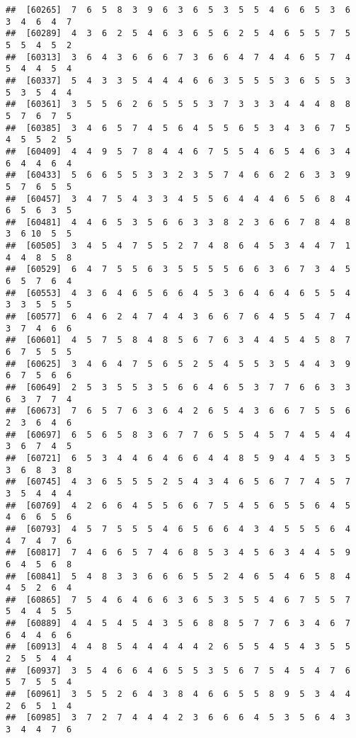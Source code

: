 \documentclass[
]{book}
\begin{document}
\begin{verbatim}
##  [60265]  7  6  5  8  3  9  6  3  6  5  3  5  5  4  6  6  5  3  6  3  4  6  4  7
##  [60289]  4  3  6  2  5  4  6  3  6  5  6  2  5  4  6  5  5  7  5  5  5  4  5  2
##  [60313]  3  6  4  3  6  6  6  7  3  6  6  4  7  4  4  6  5  7  4  5  4  4  5  4
##  [60337]  5  4  3  3  5  4  4  4  6  6  3  5  5  5  3  6  5  5  3  5  3  5  4  4
##  [60361]  3  5  5  6  2  6  5  5  5  3  7  3  3  3  4  4  4  8  8  5  7  6  7  5
##  [60385]  3  4  6  5  7  4  5  6  4  5  5  6  5  3  4  3  6  7  5  4  5  5  2  5
##  [60409]  4  4  9  5  7  8  4  4  6  7  5  5  4  6  5  4  6  3  4  6  4  4  6  4
##  [60433]  5  6  6  5  5  3  3  2  3  5  7  4  6  6  2  6  3  3  9  5  7  6  5  5
##  [60457]  3  4  7  5  4  3  3  4  5  5  6  4  4  4  6  5  6  8  4  6  5  6  3  5
##  [60481]  4  4  6  5  3  5  6  6  3  3  8  2  3  6  6  7  8  4  8  3  6 10  5  5
##  [60505]  3  4  5  4  7  5  5  2  7  4  8  6  4  5  3  4  4  7  1  4  4  8  5  8
##  [60529]  6  4  7  5  5  6  3  5  5  5  5  6  6  3  6  7  3  4  5  6  5  7  6  4
##  [60553]  4  3  6  4  6  5  6  6  4  5  3  6  4  6  4  6  5  5  4  3  3  5  5  5
##  [60577]  6  4  6  2  4  7  4  4  3  6  6  7  6  4  5  5  4  7  4  3  7  4  6  6
##  [60601]  4  5  7  5  8  4  8  5  6  7  6  3  4  4  5  4  5  8  7  6  7  5  5  5
##  [60625]  3  4  6  4  7  5  6  5  2  5  4  5  5  3  5  4  4  3  9  6  7  5  6  6
##  [60649]  2  5  3  5  5  3  5  6  6  4  6  5  3  7  7  6  6  3  3  6  3  7  7  4
##  [60673]  7  6  5  7  6  3  6  4  2  6  5  4  3  6  6  7  5  5  6  2  3  6  4  6
##  [60697]  6  5  6  5  8  3  6  7  7  6  5  5  4  5  7  4  5  4  4  3  6  7  4  5
##  [60721]  6  5  3  4  4  6  4  6  6  4  4  8  5  9  4  4  5  3  5  3  6  8  3  8
##  [60745]  4  3  6  5  5  5  2  5  4  3  4  6  5  6  7  7  4  5  7  3  5  4  4  4
##  [60769]  4  2  6  6  4  5  5  6  6  7  5  4  5  6  5  5  6  4  5  4  6  6  5  6
##  [60793]  4  5  7  5  5  5  4  6  5  6  6  4  3  4  5  5  5  6  4  4  7  4  7  6
##  [60817]  7  4  6  6  5  7  4  6  8  5  3  4  5  6  3  4  4  5  9  6  4  5  6  8
##  [60841]  5  4  8  3  3  6  6  6  5  5  2  4  6  5  4  6  5  8  4  4  5  2  6  4
##  [60865]  7  5  4  6  4  6  6  3  6  5  3  5  5  4  6  7  5  5  7  5  4  4  5  5
##  [60889]  4  4  5  4  5  4  3  5  6  8  8  5  7  7  6  3  4  6  7  6  4  4  6  6
##  [60913]  4  4  8  5  4  4  4  4  4  2  6  5  5  4  5  4  3  5  5  2  5  5  4  4
##  [60937]  3  5  4  6  6  4  6  5  5  3  5  6  7  5  4  5  4  7  6  5  7  5  5  4
##  [60961]  3  5  5  2  6  4  3  8  4  6  6  5  5  8  9  5  3  4  4  2  6  5  1  4
##  [60985]  3  7  2  7  4  4  4  2  3  6  6  6  4  5  3  5  6  4  3  3  4  4  7  6

\end{verbatim}
\end{document}
